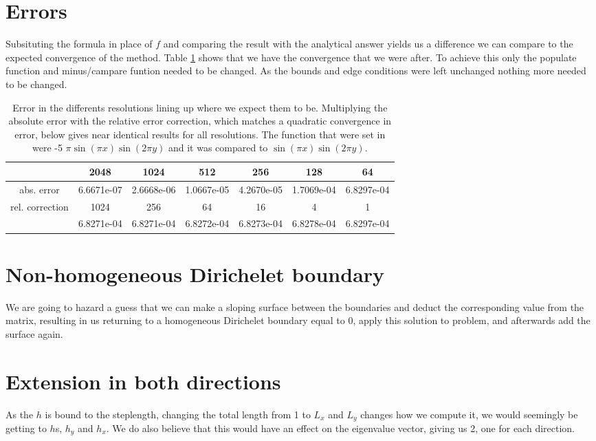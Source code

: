 \section{Errors}
Subsituting the formula in place of $f$ and comparing the result with the analytical answer yields us a difference we can compare to the expected convergence of the method. Table \ref{tab:relerr} shows that we have the convergence that we were after. To achieve this only the populate function and minus/campare funtion needed to be changed. As the bounds and edge conditions were left unchanged nothing more needed to be changed.  

\begin{table}[t]
\caption{\label{tab:relerr}Error in the differents resolutions lining up where we expect them to be. Multiplying the absolute error with the relative error correction, which matches a quadratic convergence in error, below gives near identical results for all resolutions. The function that were set in were -5 $\pi \sin(\pi x ) \sin(2\pi y)$ and it was compared to $\sin(\pi x ) \sin(2\pi y)$. }

{\footnotesize
\begin{tabular}{|c|c|c|c|c|c|c|}
\hline 
 &  2048 & 1024 & 512 & 256 & 128 & 64 \\ 
\hline 
abs. error &6.6671e-07  & 2.6668e-06 &  1.0667e-05  & 4.2670e-05 &  1.7069e-04 &  6.8297e-04\\
\hline 
rel. correction  & 1024 &   256   &  64   &  16  &    4   &   1\\
\hline 
& 6.8271e-04 &  6.8271e-04 &  6.8272e-04 &  6.8273e-04 &  6.8278e-04  & 6.8297e-04\\
\hline 
\end{tabular}
}
\end{table} 


\section{Non-homogeneous Dirichelet boundary} 
We are going to hazard a guess that we can make a sloping surface between the boundaries and deduct the corresponding value from the matrix, resulting in us returning to a homogeneous Dirichelet boundary equal to 0, apply this solution to problem, and afterwards add the surface again. 

\section{Extension in both directions}
As the $h$ is bound to the steplength, changing the total length from 1 to $L_x$ and $L_y$ changes how we compute it, we would seemingly be getting to $h$s, $h_y$ and $h_x$. We do also believe that this would have an effect on the eigenvalue vector, giving us 2, one for each direction. 